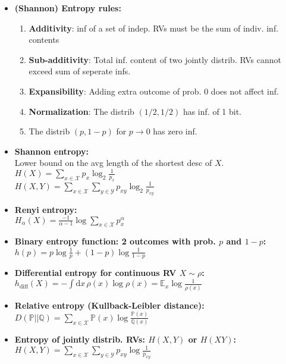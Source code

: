 \documentclass[twocolumn,9pt]{extarticle}
\begin{document}
\begin{itemize}
	\item \textbf{(Shannon) Entropy rules:}
		\begin{enumerate}
			\item \textbf{Additivity}: inf of a set of indep. RVs must be the sum of indiv. inf. contents 
			\item \textbf{Sub-additivity}: Total inf. content of two jointly distrib. RVs cannot exceed sum of seperate infs.
			\item \textbf{Expansibility}: Adding extra outcome of prob. 0 does not affect inf.
			\item \textbf{Normalization}: The distrib $(1/2,1/2)$ has inf. of 1 bit.
			\item The distrib $(p, 1-p)$ for $p \to 0$ has zero inf.
		\end{enumerate}

	\item \textbf{Shannon entropy:} \\
	Lower bound on the avg length of the shortest desc of $X$.\\
	$H(X) = \sum_{x \in \mathcal{X}} p_x \log_2 \frac{1}{p_x}$\\
	$H(X,Y) = \sum_{x \in \mathcal{X}} \sum_{y \in \mathcal{Y}} p_{xy} \log_2 \frac{1}{p_{xy}}$

	\item \textbf{Renyi entropy:} \\
	$H_\alpha(X) = \frac{-1}{\alpha - 1} \log \sum_{x \in \mathcal{X}} p^\alpha_x$

	\item \textbf{Binary entropy function: 2 outcomes with prob. $p$ and $1-p$: } \\
	$h(p) = p \log \frac{1}{p} + (1 - p) \log \frac{1}{1-p}$

	\item \textbf{Differential entropy for continuous RV $X \sim \rho$:} \\
	$h_{\text{diff}}(X) = - \int \mathrm{d}x\, \rho(x) \log \rho(x) = \mathbb{E}_x \log \frac{1}{\rho(x)}$

	\item \textbf{Relative entropy (Kullback-Leibler distance): } \\
	$D(\mathbb{P}||\mathbb{Q}) = \sum_{x \in \mathcal{X}} \mathbb{P}(x) \log \frac{\mathbb{P}(x)}{\mathbb{Q}(x)}$

	\item \textbf{Entropy of jointly distrib. RVs: $H(X,Y)$ or $H(XY)$: } \\
	$H(X,Y) = \sum_{x \in \mathcal{X}} \sum_{y \in \mathcal{Y}} p_{xy} \log \frac{1}{p_{xy}}$


\end{itemize}
\end{document}
